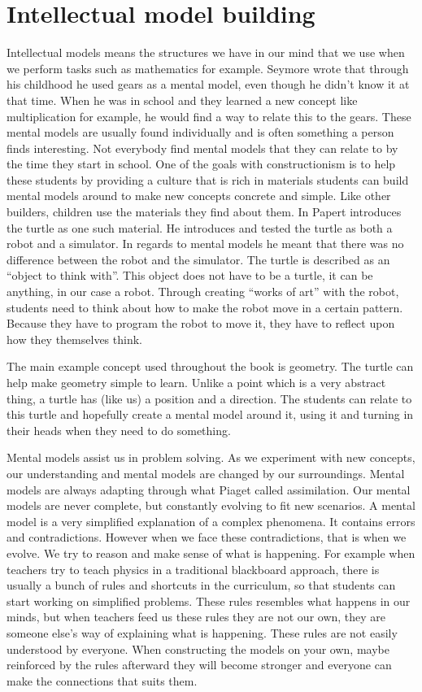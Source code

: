 \section{Intellectual model building}
Intellectual models means the structures we have in our mind that we use when we perform tasks such as mathematics for example. Seymore wrote that through his childhood he used gears as a mental model, even though he didn't know it at that time. When he was in school and they learned a new concept like multiplication for example, he would find a way to relate this to the gears. These mental models are usually found individually and is often something a person finds interesting. Not everybody find mental models that they can relate to by the time they start in school. One of the goals with constructionism is to help these students by providing a culture that is rich in materials students can build mental models around to make new concepts concrete and simple. Like other builders, children use the materials they find about them. In \cite{papert1980mindstorms} Papert introduces the turtle as one such material. He introduces and tested the turtle as both a robot and a simulator. In regards to mental models he meant that there was no difference between the robot and the simulator. The turtle is described as an ``object to think with''. This object does not have to be a turtle, it can be anything, in our case a robot. Through creating ``works of art'' with the robot, students need to think about how to make the robot move in a certain pattern. Because they have to program the robot to move it, they have to reflect upon how they themselves think. 

\bigskip\noindent
The main example concept used throughout the book is geometry. The turtle can help make geometry simple to learn. Unlike a point which is a very abstract thing, a turtle has (like us) a position and a direction. The students can relate to this turtle and hopefully create a mental model around it, using it and turning in their heads when they need to do something. 

\bigskip\noindent
Mental models assist us in problem solving. As we experiment with new concepts, our understanding and mental models are changed by our surroundings. Mental models are always adapting through what Piaget called assimilation. Our mental models are never complete, but constantly evolving to fit new scenarios. A mental model is a very simplified explanation of a complex phenomena. It contains errors and contradictions. However when we face these contradictions, that is when we evolve. We try to reason and make sense of what is happening. For example when teachers try to teach physics in a traditional blackboard approach, there is usually a bunch of rules and shortcuts in the curriculum, so that students can start working on simplified problems. These rules resembles what happens in our minds, but when teachers feed us these rules they are not our own, they are someone else's way of explaining what is happening. These rules are not easily understood by everyone. When constructing the models on your own, maybe reinforced by the rules afterward they will become stronger and everyone can make the connections that suits them. 

